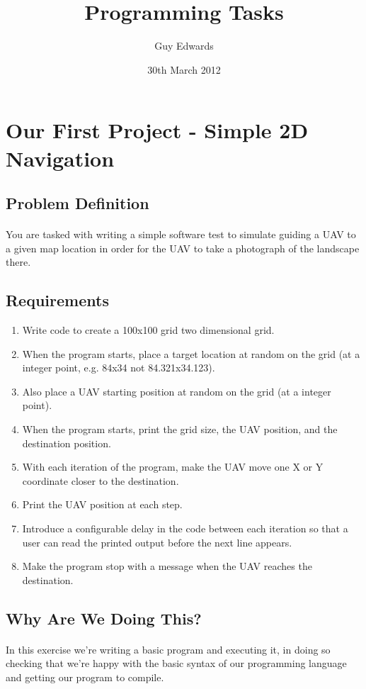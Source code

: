 \documentclass[11pt]{book}
\title{\textbf{Programming Tasks}}
\author{Guy Edwards}
\date{30th March 2012}
\begin{document}
\section{Our First Project - Simple 2D Navigation}

\subsection{Problem Definition}

\paragraph{} You are tasked with writing a simple software test to simulate guiding a UAV to a given map location in order for the UAV to take a photograph of the landscape there. 

\subsection{Requirements}

\begin{enumerate}
\item Write code to create a 100x100 grid two dimensional grid.
\item When the program starts, place a target location at random on the grid (at a integer point, e.g. 84x34 not 84.321x34.123).
\item Also place a UAV starting position at random on the grid (at a integer point).
\item When the program starts, print the grid size, the UAV position, and the destination position.
\item With each iteration of the program, make the UAV move one X or Y coordinate closer to the destination.
\item Print the UAV position at each step.
\item Introduce a configurable delay in the code between each iteration so that a user can read the printed output before the next line appears.
\item Make the program stop with a message when the UAV reaches the destination.
\end{enumerate}

\subsection{Why Are We Doing This?}

\paragraph{} In this exercise we're writing a basic program and executing it, in doing so checking that we're happy with the basic syntax of our programming language and getting our program to compile.
\end{document}
